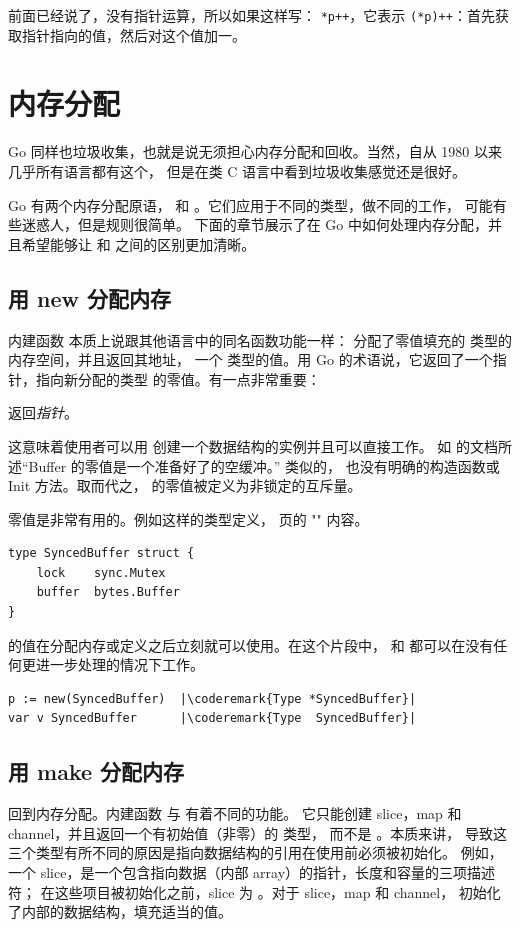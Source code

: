 前面已经说了，没有指针运算，所以如果这样写：
\lstinline{*p++}，它表示 \lstinline{(*p)++}：首先获取指针指向的值，然后对这个值加一。


\section{内存分配}
Go 同样也垃圾收集，也就是说无须担心内存分配和回收。当然，自从 1980 以来几乎所有语言都有这个，
但是在类 C 语言中看到垃圾收集感觉还是很好。

Go 有两个内存分配原语， 和 。它们应用于不同的类型，做不同的工作，
可能有些迷惑人，但是规则很简单。
下面的章节展示了在 Go 中如何处理内存分配，并且希望能够让
 和  之间的区别更加清晰。

\subsection{用 new 分配内存}
\label{sec:allocation with new}
内建函数  本质上说跟其他语言中的同名函数功能一样：
 分配了零值填充的  类型的内存空间，并且返回其地址，
一个  类型的值。用 Go 的术语说，它返回了一个指针，指向新分配的类型 
的零值。有一点非常重要：
\begin{lbar}[]
 返回\emph{指针}。
\end{lbar}

这意味着使用者可以用  创建一个数据结构的实例并且可以直接工作。
如  的文档所述“Buffer 的零值是一个准备好了的空缓冲。”
类似的， 也没有明确的构造函数或 Init 方法。取而代之，
 的零值被定义为非锁定的互斥量。

零值是非常有用的。例如这样的类型定义，\pageref{sec:defining your own}
页的 "" 内容。
\begin{lstlisting}
type SyncedBuffer struct {
    lock    sync.Mutex
    buffer  bytes.Buffer
}
\end{lstlisting}
 的值在分配内存或定义之后立刻就可以使用。在这个片段中，
 和  都可以在没有任何更进一步处理的情况下工作。
\begin{lstlisting}
p := new(SyncedBuffer)  |\coderemark{Type *SyncedBuffer}|
var v SyncedBuffer      |\coderemark{Type  SyncedBuffer}|
\end{lstlisting}

\subsection{用 make 分配内存}
\label{sec:allocation with make}
回到内存分配。内建函数  与  有着不同的功能。
它只能创建 slice，map 和 channel，并且返回一个有初始值（非零）的  类型，
而不是 。本质来讲，
导致这三个类型有所不同的原因是指向数据结构的引用在使用前必须被初始化。
例如，一个 slice，是一个包含指向数据（内部 array）的指针，长度和容量的三项描述符；
在这些项目被初始化之前，slice 为 。对于 slice，map 和 channel，
 初始化了内部的数据结构，填充适当的值。

